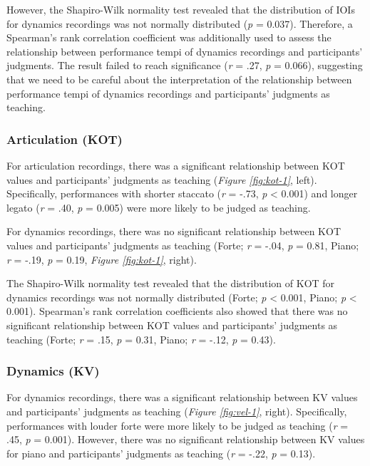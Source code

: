 \documentclass[
  man,floatsintext]{apa6}
\begin{document}
However, the Shapiro-Wilk normality test revealed that the distribution of IOIs for dynamics recordings was not normally distributed (\emph{p} = 0.037). Therefore, a Spearman's rank correlation coefficient was additionally used to assess the relationship between performance tempi of dynamics recordings and participants' judgments. The result failed to reach significance (\emph{r} = .27, \emph{p} = 0.066), suggesting that we need to be careful about the interpretation of the relationship between performance tempi of dynamics recordings and participants' judgments as teaching.

\hypertarget{articulation-kot}{%
\subsubsection{Articulation (KOT)}\label{articulation-kot}}

For articulation recordings, there was a significant relationship between KOT values and participants' judgments as teaching (\emph{Figure \ref{fig:kot-1}}, left). Specifically, performances with shorter staccato (\emph{r} = -.73, \emph{p} \textless{} 0.001) and longer legato (\emph{r} = .40, \emph{p} = 0.005) were more likely to be judged as teaching.

For dynamics recordings, there was no significant relationship between KOT values and participants' judgments as teaching (Forte; \emph{r} = -.04, \emph{p} = 0.81, Piano; \emph{r} = -.19, \emph{p} = 0.19, \emph{Figure \ref{fig:kot-1}}, right).

The Shapiro-Wilk normality test revealed that the distribution of KOT for dynamics recordings was not normally distributed (Forte; \emph{p} \textless{} 0.001, Piano; \emph{p} \textless{} 0.001). Spearman's rank correlation coefficients also showed that there was no significant relationship between KOT values and participants' judgments as teaching (Forte; \emph{r} = .15, \emph{p} = 0.31, Piano; \emph{r} = -.12, \emph{p} = 0.43).

\hypertarget{dynamics-kv}{%
\subsubsection{Dynamics (KV)}\label{dynamics-kv}}

For dynamics recordings, there was a significant relationship between KV values and participants' judgments as teaching (\emph{Figure \ref{fig:vel-1}}, right). Specifically, performances with louder forte were more likely to be judged as teaching (\emph{r} = .45, \emph{p} = 0.001). However, there was no significant relationship between KV values for piano and participants' judgments as teaching (\emph{r} = -.22, \emph{p} = 0.13).
\end{document}
